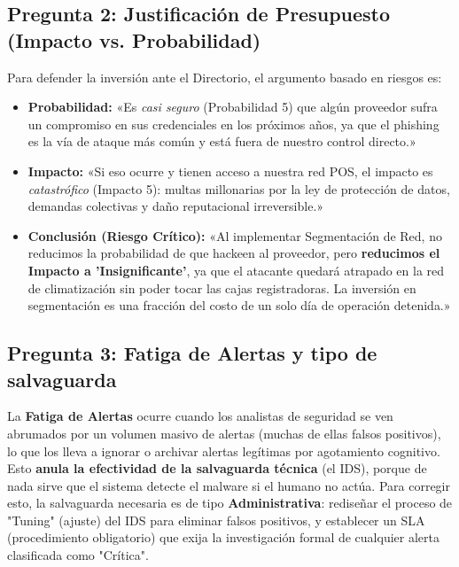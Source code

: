 \documentclass[11pt,a4paper]{article}
\begin{document}
\subsection*{Pregunta 2: Justificación de Presupuesto (Impacto vs. Probabilidad)}
\begin{respuesta}
Para defender la inversión ante el Directorio, el argumento basado en riesgos es:
\begin{itemize}[leftmargin=*]
  \item \textbf{Probabilidad:} «Es \textit{casi seguro} (Probabilidad 5) que algún proveedor sufra un compromiso en sus credenciales en los próximos años, ya que el phishing es la vía de ataque más común y está fuera de nuestro control directo.»
  \item \textbf{Impacto:} «Si eso ocurre y tienen acceso a nuestra red POS, el impacto es \textit{catastrófico} (Impacto 5): multas millonarias por la ley de protección de datos, demandas colectivas y daño reputacional irreversible.»
  \item \textbf{Conclusión (Riesgo Crítico):} «Al implementar Segmentación de Red, no reducimos la probabilidad de que hackeen al proveedor, pero \textbf{reducimos el Impacto a 'Insignificante'}, ya que el atacante quedará atrapado en la red de climatización sin poder tocar las cajas registradoras. La inversión en segmentación es una fracción del costo de un solo día de operación detenida.»
\end{itemize}
\end{respuesta}

\subsection*{Pregunta 3: Fatiga de Alertas y tipo de salvaguarda}
\begin{respuesta}
La \textbf{Fatiga de Alertas} ocurre cuando los analistas de seguridad se ven abrumados por un volumen masivo de alertas (muchas de ellas falsos positivos), lo que los lleva a ignorar o archivar alertas legítimas por agotamiento cognitivo. 
Esto \textbf{anula la efectividad de la salvaguarda técnica} (el IDS), porque de nada sirve que el sistema detecte el malware si el humano no actúa.
Para corregir esto, la salvaguarda necesaria es de tipo \textbf{Administrativa}: rediseñar el proceso de "Tuning" (ajuste) del IDS para eliminar falsos positivos, y establecer un SLA (procedimiento obligatorio) que exija la investigación formal de cualquier alerta clasificada como "Crítica".
\end{respuesta}
\end{document}
